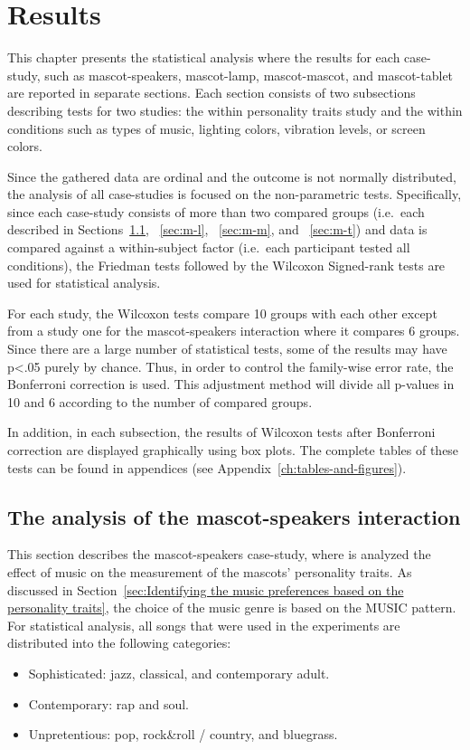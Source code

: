 \chapter{Results}
\label{ch:results}
This chapter presents the statistical analysis where the results
for each case-study, such as mascot-speakers, mascot-lamp, mascot-mascot, and
mascot-tablet are reported in separate sections.
Each section consists of two subsections describing tests for two
studies: the within personality traits study and the within conditions such as types of music, lighting colors,
vibration levels, or screen colors.

Since the gathered data are ordinal and the outcome
is not normally distributed, the analysis of all case-studies is focused on the non-parametric tests.
Specifically, since each case-study consists of more than two compared groups
(i.e.\ each described in Sections~\ref{sec:m-s}, ~\ref{sec:m-l}, ~\ref{sec:m-m}, and ~\ref{sec:m-t})
and data is compared against a within-subject factor (i.e.\ each participant tested all conditions),
the Friedman tests followed by the Wilcoxon Signed-rank tests are used for statistical analysis.

For each study, the Wilcoxon tests compare 10 groups with each other except from a
study one for the mascot-speakers interaction where it compares 6 groups.
Since there are a large number of statistical tests,
some of the results may have p<.05 purely by chance.
Thus, in order to control the family-wise error rate, the Bonferroni
correction is used.
This adjustment method will divide all p-values in 10 and 6 according to the number of compared groups.

In addition, in each subsection, the results of Wilcoxon tests after Bonferroni correction are
displayed graphically using box plots.
The complete tables of these tests can be found in appendices (see Appendix~\ref{ch:tables-and-figures}).

\section{The analysis of the mascot-speakers interaction}
\label{sec:m-s}
This section describes the mascot-speakers case-study, where is analyzed the effect of music
on the measurement of the mascots' personality traits.
As discussed in Section~\ref{sec:Identifying the music preferences based on the personality traits},
the choice of the music genre is based on the MUSIC pattern.
For statistical analysis, all songs that were used in the experiments are
distributed into the following categories:
\begin{itemize}
    \item Sophisticated: jazz, classical, and contemporary adult.
    \item Contemporary: rap and soul.
    \item Unpretentious: pop, rock\&roll / country, and bluegrass.
\end{itemize}

